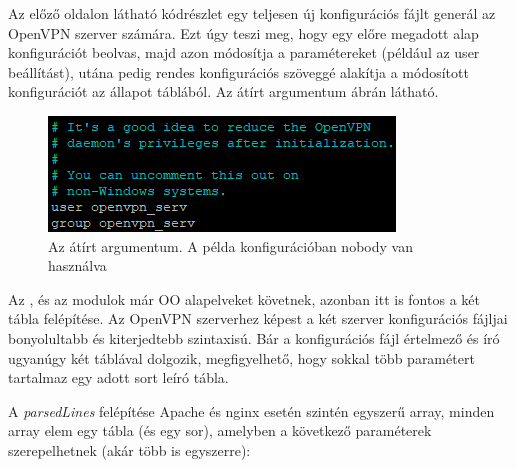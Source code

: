 Az előző oldalon látható kódrészlet egy teljesen új konfigurációs fájlt generál az OpenVPN szerver számára. Ezt úgy teszi meg, hogy egy előre megadott alap konfigurációt beolvas, majd azon módosítja a paramétereket (például az user beállítást), utána pedig rendes konfigurációs szöveggé alakítja a módosított konfigurációt az állapot táblából. Az átírt argumentum  ábrán látható.

\begin{figure}[h]
\centering
\includegraphics[scale=1.0]{images/openvpn_config_edit_example.png}
\caption{Az átírt  argumentum. A példa konfigurációban nobody van használva}
\label{fig:openvpn_config_edit_example}
\end{figure}


Az \textit{}, és az \textit{} modulok már OO alapelveket követnek, azonban itt is fontos a két tábla felépítése. Az OpenVPN szerverhez képest a két szerver konfigurációs fájljai bonyolultabb és kiterjedtebb szintaxisú. Bár a konfigurációs fájl értelmező és író ugyanúgy két táblával dolgozik, megfigyelhető, hogy sokkal több paramétert tartalmaz egy adott sort leíró tábla.

A \textit{parsedLines} felépítése Apache és nginx esetén szintén egyszerű array, minden array elem egy tábla (és egy sor), amelyben a következő paraméterek szerepelhetnek (akár több is egyszerre):

